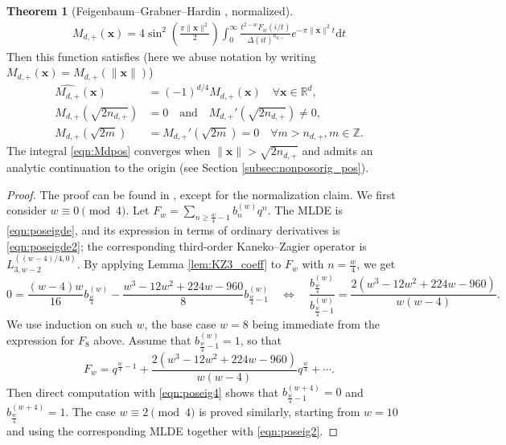\documentclass[10pt,reqno]{amsproc}
\newcommand{\dd}{\mathrm{d}}
\newcommand{\bx}{\mathbf{x}}
\newcommand{\1}{\mathds{1}}	%
\theoremstyle{definition}
\newtheorem{theorem}{Theorem}[section]
\theoremstyle{remark}
\begin{document}
\begin{theorem}[Feigenbaum--Grabner--Hardin \cite{feigenbaum2021eigenfunctions}, normalized]
\begin{align}
    \label{eqn:Mdpos}
    M_{d, +}(\mathbf{x}) = 4 \sin^{2} \left(\frac{\pi \|\mathbf{x}\|^{2}}{2}\right) \int_{0}^{\infty} \frac{t^{2-w}F_{w}(i/t)}{\Delta(it)^{n_{d,+}}} e^{-\pi \|\mathbf{x}\|^{2} t} \dd t
\end{align}
Then this function satisfies (here we abuse notation by writing $M_{d,+}(\mathbf{x}) = M_{d,+}(\|\mathbf{x}\|)$)
\begin{align*}
    \widehat{M_{d,+}}(\mathbf{x}) &= (-1)^{d/4} M_{d,+}(\mathbf{x}) \quad \forall \mathbf{x} \in \mathbb{R}^{d}, \\
    M_{d,+}(\sqrt{2 n_{d,+}}) &= 0\quad\text{and}\quad M_{d,+}'(\sqrt{2n_{d,+}}) \neq 0, \\
    M_{d,+}(\sqrt{2m}) &= M_{d,+}'(\sqrt{2m}) = 0 \quad\forall m > n_{d,+}, m \in \mathbb{Z}.
\end{align*}
The integral \eqref{eqn:Mdpos} converges when $\|\bx\| > \sqrt{2n_{d,+}}$ and admits an analytic continuation to the origin (see Section \ref{subsec:nonposorig_pos}).
\end{theorem}

\begin{proof}
    The proof can be found in \cite{feigenbaum2021eigenfunctions}, except for the normalization claim.
    We first consider $w \equiv 0 \pmod{4}$.
    Let $F_w = \sum_{n \ge \frac{w}{4} - 1} b_n^{(w)} q^n$.
    The MLDE is \eqref{eqn:poseigde}, and its expression in terms of ordinary derivatives is \eqref{eqn:poseigde2}; the corresponding third-order Kaneko--Zagier operator is $L_{3,w-2}^{((w-4)/4, 0)}$.
    By applying Lemma \ref{lem:KZ3_coeff} to $F_{w}$ with $n = \frac{w}{4}$, we get
    \[
        0 = \frac{(w-4)w}{16} b_{\frac{w}{4}}^{(w)} - \frac{w^3 - 12w^2 + 224w - 960}{8} b_{\frac{w}{4}-1}^{(w)}
        \quad\Leftrightarrow\quad
        \frac{b_{\frac{w}{4}}^{(w)}}{b_{\frac{w}{4}-1}^{(w)}} = \frac{2(w^3 - 12w^2 + 224w - 960)}{w(w-4)}.
    \]
    We use induction on such $w$, the base case $w = 8$ being immediate from the expression for $F_8$ above.
    Assume that $b_{\frac{w}{4}-1}^{(w)} = 1$, so that
    \begin{equation}
        \label{eqn:F_qexp}
        F_w = q^{\frac{w}{4} - 1} + \frac{2(w^3 - 12w^2 + 224w - 960)}{w(w-4)} q^{\frac{w}{4}} + \cdots.
    \end{equation}
    Then direct computation with \eqref{eqn:poseig4} shows that $b_{\frac{w}{4}-1}^{(w+4)} = 0$ and $b_{\frac{w}{4}}^{(w+4)} = 1$.
    The case $w \equiv 2 \pmod{4}$ is proved similarly, starting from $w=10$ and using the corresponding MLDE \cite[eq. (5$\cdot$20)]{feigenbaum2021eigenfunctions} together with \eqref{eqn:poseig2}.
\end{proof}
\end{document}
